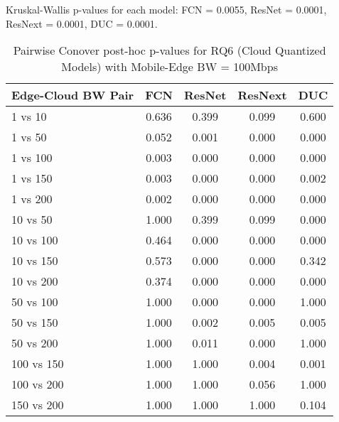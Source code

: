 \begin{table}[h]
\centering
\caption{Pairwise Conover post-hoc p-values for RQ6 (Cloud Quantized Models) with Mobile-Edge BW = 100Mbps}
\label{tab:conover_cloud_quantized_me100}
\smallskip
Kruskal-Wallis p-values for each model: FCN = 0.0055, ResNet = 0.0001, ResNext = 0.0001, DUC = 0.0001.

\begin{tabular}{lcccc}
\toprule
Edge-Cloud BW Pair & FCN & ResNet & ResNext & DUC \\
\midrule
1 vs 10 & 0.636 & 0.399 & 0.099 & 0.600 \\
1 vs 50 & 0.052 & 0.001 & 0.000 & 0.000 \\
1 vs 100 & 0.003 & 0.000 & 0.000 & 0.000 \\
1 vs 150 & 0.003 & 0.000 & 0.000 & 0.002 \\
1 vs 200 & 0.002 & 0.000 & 0.000 & 0.000 \\
10 vs 50 & 1.000 & 0.399 & 0.099 & 0.000 \\
10 vs 100 & 0.464 & 0.000 & 0.000 & 0.000 \\
10 vs 150 & 0.573 & 0.000 & 0.000 & 0.342 \\
10 vs 200 & 0.374 & 0.000 & 0.000 & 0.000 \\
50 vs 100 & 1.000 & 0.000 & 0.000 & 1.000 \\
50 vs 150 & 1.000 & 0.002 & 0.005 & 0.005 \\
50 vs 200 & 1.000 & 0.011 & 0.000 & 1.000 \\
100 vs 150 & 1.000 & 1.000 & 0.004 & 0.001 \\
100 vs 200 & 1.000 & 1.000 & 0.056 & 1.000 \\
150 vs 200 & 1.000 & 1.000 & 1.000 & 0.104 \\
\bottomrule
\end{tabular}
\end{table}

